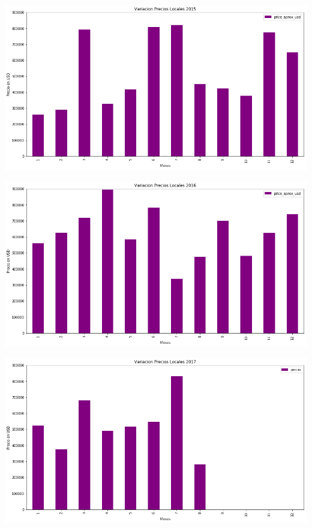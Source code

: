 \documentclass[a4paper, 10pt]{article}
\begin{document}
			\begin{center}
   		    		\includegraphics[width=\textwidth]{images/vLoc2015}
			\end{center}			
			
			\begin{center}
   		    		\includegraphics[width=\textwidth]{images/vLoc2016}
			\end{center}			
			
			\begin{center}
   		    		\includegraphics[width=\textwidth]{images/vLoc2017}
			\end{center}
			
\end{document}
